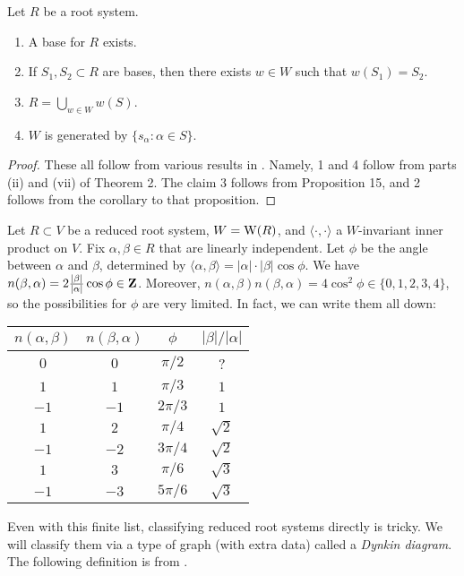\begin{theorem}
Let $R$ be a root system. 
\begin{enumerate}
\item A base for $R$ exists. 
\item If $S_1,S_2\subset R$ are bases, then there exists $w\in W$ such that 
$w(S_1)=S_2$. 
\item $R=\bigcup_{w\in W} w(S)$. 
\item $W$ is generated by $\{s_\alpha:\alpha\in S\}$. 
\end{enumerate}
\end{theorem}
\begin{proof}
These all follow from various results in 
\cite[VI \S 1.5]{bourbaki-lie-alg-4-6}. Namely, 1 and 4 follow from parts 
(ii) and (vii) of Theorem 2. The claim 3 follows from Proposition 15, and 2 
follows from the corollary to that proposition. 
\end{proof}

Let $R\subset V$ be a reduced root system, $W=\operatorname{W}(R)$, and 
$\langle\cdot,\cdot\rangle$ a $W$-invariant inner product on $V$. Fix 
$\alpha,\beta\in R$ that are linearly independent. Let $\phi$ be the angle 
between $\alpha$ and $\beta$, determined by 
$\langle \alpha,\beta\rangle = |\alpha|\cdot |\beta| \cos\phi$. We have 
$n(\beta,\alpha)=2\frac{|\beta|}{|\alpha|}\cos\phi\in \mathbf{Z}$. Moreover, 
$n(\alpha,\beta)n(\beta,\alpha)=4\cos^2\phi\in \{0,1,2,3,4\}$, so the 
possibilities for $\phi$ are very limited. In fact, we can write them all 
down:  
\begin{center}
\begin{tabular}{c|c|c|c}
  $n(\alpha,\beta)$ & $n(\beta,\alpha)$ & $\phi$ & $|\beta|/|\alpha|$ \\ \hline 
  $0$  & $0$  & $\pi/2$  & ? \\
  $1$  & $1$  & $\pi/3$  & $1$ \\
  $-1$ & $-1$ & $2\pi/3$ & $1$ \\
  $1$  & $2$  & $\pi/4$  & $\sqrt 2$ \\
  $-1$ & $-2$ & $3\pi/4$ & $\sqrt 2$ \\
  $1$  & $3$  & $\pi/6$  & $\sqrt 3$ \\
  $-1$ & $-3$ & $5\pi/6$ & $\sqrt 3$
\end{tabular}
\end{center}

Even with this finite list, classifying reduced root systems directly is 
tricky. We will classify them via a type of graph (with extra data) called a 
\emph{Dynkin diagram}. The following definition is from 
\cite[VI \S 4.2]{bourbaki-lie-alg-4-6}.

